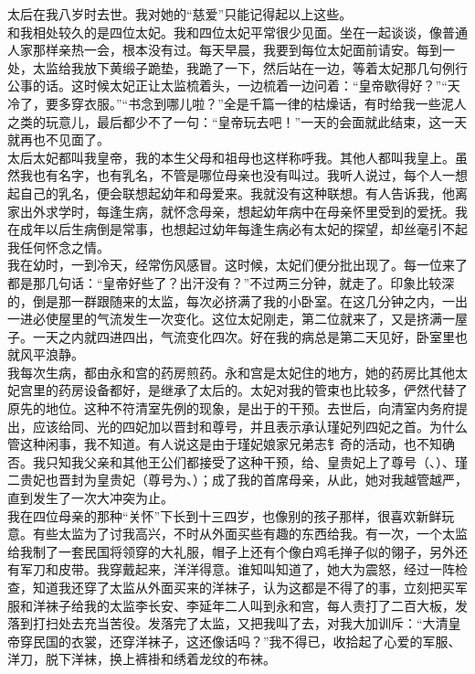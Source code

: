 太后在我八岁时去世。我对她的“慈爱”只能记得起以上这些。\\

和我相处较久的是四位太妃。我和四位太妃平常很少见面。坐在一起谈谈，像普通人家那样亲热一会，根本没有过。每天早晨，我要到每位太妃面前请安。每到一处，太监给我放下黄缎子跪垫，我跪了一下，然后站在一边，等着太妃那几句例行公事的话。这时候太妃正让太监梳着头，一边梳着一边问着：“皇帝歇得好？”“天冷了，要多穿衣服。”“书念到哪儿啦？”全是千篇一律的枯燥话，有时给我一些泥人之类的玩意儿，最后都少不了一句：“皇帝玩去吧！”一天的会面就此结束，这一天就再也不见面了。\\

太后太妃都叫我皇帝，我的本生父母和祖母也这样称呼我。其他人都叫我皇上。虽然我也有名字，也有乳名，不管是哪位母亲也没有叫过。我听人说过，每个人一想起自己的乳名，便会联想起幼年和母爱来。我就没有这种联想。有人告诉我，他离家出外求学时，每逢生病，就怀念母亲，想起幼年病中在母亲怀里受到的爱抚。我在成年以后生病倒是常事，也想起过幼年每逢生病必有太妃的探望，却丝毫引不起我任何怀念之情。\\

我在幼时，一到冷天，经常伤风感冒。这时候，太妃们便分批出现了。每一位来了都是那几句话：“皇帝好些了？出汗没有？”不过两三分钟，就走了。印象比较深的，倒是那一群跟随来的太监，每次必挤满了我的小卧室。在这几分钟之内，一出一进必使屋里的气流发生一次变化。这位太妃刚走，第二位就来了，又是挤满一屋子。一天之内就四进四出，气流变化四次。好在我的病总是第二天见好，卧室里也就风平浪静。\\

我每次生病，都由永和宫的药房煎药。永和宫是太妃住的地方，她的药房比其他太妃宫里的药房设备都好，是继承了太后的。太妃对我的管束也比较多，俨然代替了原先的地位。这种不符清室先例的现象，是出于的干预。去世后，向清室内务府提出，应该给同、光的四妃加以晋封和尊号，并且表示承认瑾妃列四妃之首。为什么管这种闲事，我不知道。有人说这是由于瑾妃娘家兄弟志钅奇的活动，也不知确否。我只知我父亲和其他王公们都接受了这种干预，给、皇贵妃上了尊号（、）、瑾二贵妃也晋封为皇贵妃（尊号为、）；成了我的首席母亲，从此，她对我越管越严，直到发生了一次大冲突为止。\\

我在四位母亲的那种“关怀”下长到十三四岁，也像别的孩子那样，很喜欢新鲜玩意。有些太监为了讨我高兴，不时从外面买些有趣的东西给我。有一次，一个太监给我制了一套民国将领穿的大礼服，帽子上还有个像白鸡毛掸子似的翎子，另外还有军刀和皮带。我穿戴起来，洋洋得意。谁知叫知道了，她大为震怒，经过一阵检查，知道我还穿了太监从外面买来的洋袜子，认为这都是不得了的事，立刻把买军服和洋袜子给我的太监李长安、李延年二人叫到永和宫，每人责打了二百大板，发落到打扫处去充当苦役。发落完了太监，又把我叫了去，对我大加训斥：“大清皇帝穿民国的衣裳，还穿洋袜子，这还像话吗？”我不得已，收拾起了心爱的军服、洋刀，脱下洋袜，换上裤褂和绣着龙纹的布袜。\\

